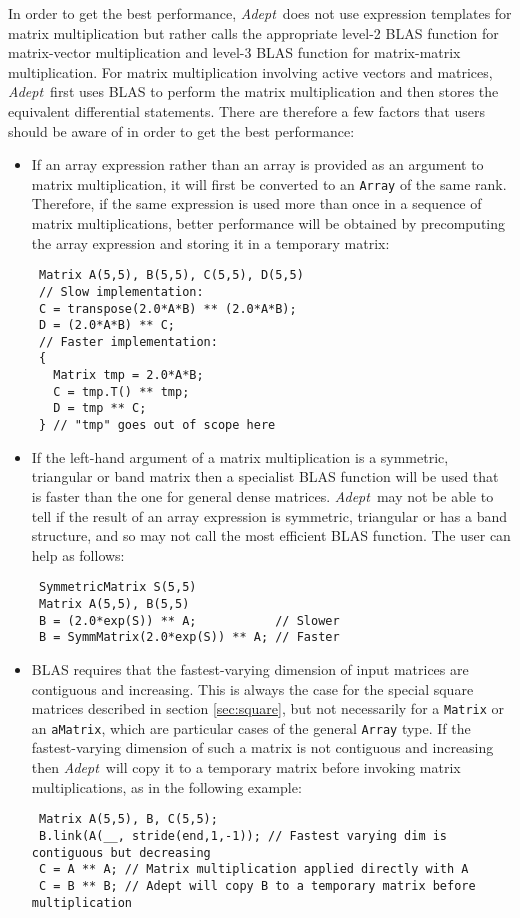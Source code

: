 \documentclass[a4,oneside]{book}
\def\codesize{\small}
\def\Adept{\emph{Adept}}
\def\code#1{{\codesize\texttt{#1}}}
\begin{document}
In order to get the best performance, \Adept\ does not use expression
templates for matrix multiplication but rather calls the appropriate
level-2 BLAS function for matrix-vector multiplication and level-3
BLAS function for matrix-matrix multiplication. For matrix
multiplication involving active vectors and matrices, \Adept\ first
uses BLAS to perform the matrix multiplication and then stores the
equivalent differential statements. There are therefore a few factors
that users should be aware of in order to get the best performance:
\begin{itemize}
\item If an array expression rather than an array is provided as an
  argument to matrix multiplication, it will first be converted to an
  \code{Array} of the same rank. Therefore, if the same expression is
  used more than once in a sequence of matrix multiplications, better
  performance will be obtained by precomputing the array expression
  and storing it in a temporary matrix:
\begin{lstlisting}
 Matrix A(5,5), B(5,5), C(5,5), D(5,5)
 // Slow implementation:
 C = transpose(2.0*A*B) ** (2.0*A*B);
 D = (2.0*A*B) ** C;
 // Faster implementation:
 {
   Matrix tmp = 2.0*A*B;
   C = tmp.T() ** tmp;
   D = tmp ** C;
 } // "tmp" goes out of scope here
\end{lstlisting}
\item If the left-hand argument of a matrix multiplication is a
  symmetric, triangular or band matrix then a specialist BLAS function
  will be used that is faster than the one for general dense
  matrices. \Adept\ may not be able to tell if the result of an array
  expression is symmetric, triangular or has a band structure, and so
  may not call the most efficient BLAS function. The user can help as
  follows:
\begin{lstlisting}
 SymmetricMatrix S(5,5)
 Matrix A(5,5), B(5,5)
 B = (2.0*exp(S)) ** A;           // Slower
 B = SymmMatrix(2.0*exp(S)) ** A; // Faster
\end{lstlisting}
\item BLAS requires that the fastest-varying dimension of input
  matrices are contiguous and increasing. This is always the case for
  the special square matrices described in section \ref{sec:square},
  but not necessarily for a \code{Matrix} or an \code{aMatrix}, which are
  particular cases of the general \code{Array} type. If the
  fastest-varying dimension of such a matrix is not contiguous and
  increasing then \Adept\ will copy it to a temporary matrix before
  invoking matrix multiplications, as in the following example:
\begin{lstlisting}
 Matrix A(5,5), B, C(5,5);
 B.link(A(__, stride(end,1,-1)); // Fastest varying dim is contiguous but decreasing
 C = A ** A; // Matrix multiplication applied directly with A
 C = B ** B; // Adept will copy B to a temporary matrix before multiplication
\end{lstlisting}
\end{itemize}
\end{document}
